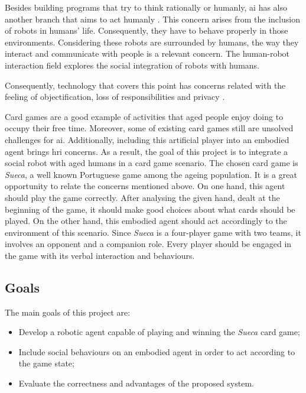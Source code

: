 Besides building programs that try to think rationally or humanly, \gls{ai} has also another branch that aims to act humanly \cite{Russell2009}.
This concern arises from the inclusion of robots in humans' life.
Consequently, they have to behave properly in those environments.
Considering these robots are surrounded by humans, the way they interact and communicate with people is a relevant concern.
The human-robot interaction field explores the social integration of robots with humans.


Consequently, technology that covers this point has concerns related with the feeling of objectification, loss of responsibilities and privacy \cite{Should2010}.


Card games are a good example of activities that aged people enjoy doing to occupy their free time.
Moreover, some of existing card games still are unsolved challenges for \gls{ai}.
Additionally, including this artificial player into an embodied agent brings \gls{hri} concerns.
As a result, the goal of this project is to integrate a social robot with aged humans in a card game scenario.
The chosen card game is \emph{Sueca}, a well known Portuguese game among the ageing population.
It is a great opportunity to relate the concerns mentioned above.
On one hand, this agent should play the game correctly.
After analysing the given hand, dealt at the beginning of the game, it should make good choices about what cards should be played.
On the other hand, this embodied agent should act accordingly to the environment of this scenario.
Since \emph{Sueca} is a four-player game with two teams, it involves an opponent and a companion role.
Every player should be engaged in the game with its verbal interaction and behaviours.



\subsection{Goals}
\label{sec:goals}

The main goals of this project are:
\begin{itemize}
\item Develop a robotic agent capable of playing and winning the \emph{Sueca} card game;
\item Include social behaviours on an embodied agent in order to act according to the game state;
\item Evaluate the correctness and advantages of the proposed system.
\end{itemize}

